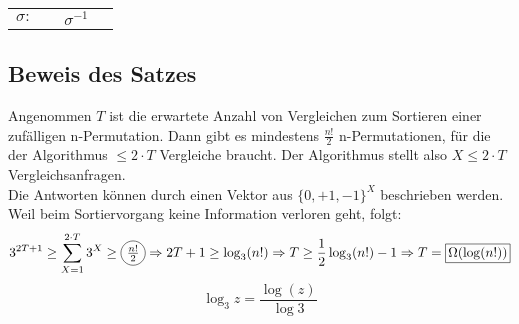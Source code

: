 \begin{center}
\newcommand{\ersterGraph}{
    \begin{tikzpicture}
    \node (1) at (0,0) {1};
    \node (2) at (0,-1) {2};
    \node (3) at (0,-2) {3};
    \node (4) at (2,0) {1};
    \node (5) at (2,-1) {2};
    \node (6) at (2,-2) {3};
    \draw[->] (1) to (6);
    \draw[->] (2) to (4);
    \draw[->] (3) to (5);
    \end{tikzpicture}}
\newcommand{\zweiterGraph}{
    \begin{tikzpicture}
    \node (1) at (0,0) {1};
    \node (2) at (0,-1) {2};
    \node (3) at (0,-2) {3};
    \node (4) at (2,0) {1};
    \node (5) at (2,-1) {2};
    \node (6) at (2,-2) {3};
    \draw[->] (1) to (5);
    \draw[->] (2) to (6);
    \draw[->] (3) to (4);
    \end{tikzpicture}}
    
    \begin{tabular}{cccc}
        $\sigma:$ & \ersterGraph & $\sigma^{-1}$ & \zweiterGraph
    \end{tabular}
\end{center}


\subsection{Beweis des Satzes}
\renewcommand*\circled[1]{\tikz[baseline=(char.base)]{
  \node[shape=circle,draw,inner sep=1pt] (char) {#1};}}
  \renewcommand*\rectangled[1]{\tikz[baseline=(char.base)]{
  \node[shape=rectangle,draw,inner sep=2pt] (char) {#1};}}
Angenommen $T$ ist die erwartete Anzahl von Vergleichen zum Sortieren einer zufälligen n-Permutation. Dann gibt es mindestens $\frac{n!}{2}$ n-Permutationen, für die der Algorithmus $\leq 2 \cdot T$ Vergleiche braucht. Der Algorithmus stellt also $X \leq 2 \cdot T$ Vergleichsanfragen.\\
Die Antworten können durch einen Vektor aus $\{0, +1, -1\}^X$ beschrieben werden. Weil beim Sortiervorgang keine Information verloren geht, folgt:
\[3^{2T + 1} \geq \sum_{X = 1}^{2 \cdot T} 3^X \geq \circled{$\frac{n!}{2}$} \Rightarrow 2T + 1 \geq \log_3(n!) \Rightarrow T \geq \frac{1}{2}\log_3(n!) -1 \Rightarrow T=\rectangled{$\Omega(\log(n!))$}\]
\[\log_3 z = \frac{\log(z)}{\log 3}\]